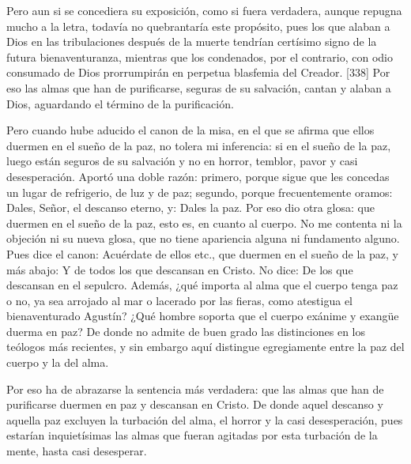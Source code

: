 Pero aun si se concediera su exposición, como si fuera verdadera, aunque repugna mucho a la letra, todavía no quebrantaría este propósito, pues los que alaban a Dios en las tribulaciones después de la muerte tendrían certísimo signo de la futura bienaventuranza, mientras que los condenados, por el contrario, con odio consumado de Dios prorrumpirán en perpetua blasfemia del Creador. [338] Por eso las almas que han de purificarse, seguras de su salvación, cantan y alaban a Dios, aguardando el término de la purificación.

Pero cuando hube aducido el canon de la misa, en el que se afirma que ellos duermen en el sueño de la paz, no tolera mi inferencia: si en el sueño de la paz, luego están seguros de su salvación y no en horror, temblor, pavor y casi desesperación. Aportó una doble razón: primero, porque sigue que les concedas un lugar de refrigerio, de luz y de paz; segundo, porque frecuentemente oramos: Dales, Señor, el descanso eterno, y: Dales la paz. Por eso dio otra glosa: que duermen en el sueño de la paz, esto es, en cuanto al cuerpo. No me contenta ni la objeción ni su nueva glosa, que no tiene apariencia alguna ni fundamento alguno. Pues dice el canon: Acuérdate de ellos etc., que duermen en el sueño de la paz, y más abajo: Y de todos los que descansan en Cristo. No dice: De los que descansan en el sepulcro. Además, ¿qué importa al alma que el cuerpo tenga paz o no, ya sea arrojado al mar o lacerado por las fieras, como atestigua el bienaventurado Agustín? ¿Qué hombre soporta que el cuerpo exánime y exangüe duerma en paz? De donde no admite de buen grado las distinciones en los teólogos más recientes, y sin embargo aquí distingue egregiamente entre la paz del cuerpo y la del alma.

Por eso ha de abrazarse la sentencia más verdadera: que las almas que han de purificarse duermen en paz y descansan en Cristo. De donde aquel descanso y aquella paz excluyen la turbación del alma, el horror y la casi desesperación, pues estarían inquietísimas las almas que fueran agitadas por esta turbación de la mente, hasta casi desesperar.

